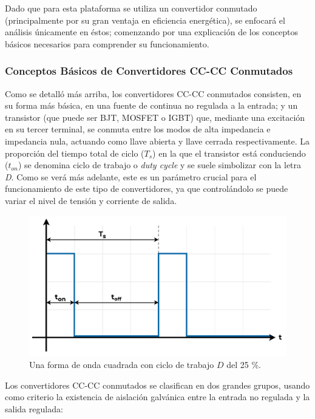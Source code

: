 Dado que para esta plataforma se utiliza un convertidor conmutado (principalmente por su gran ventaja en eficiencia energética), se enfocará el análisis únicamente en éstos; comenzando por una explicación de los conceptos básicos necesarios para comprender su funcionamiento.\\

\subsubsection{Conceptos Básicos de Convertidores CC-CC Conmutados}

Como se detalló más arriba, los convertidores CC-CC conmutados consisten, en su forma más básica, en una fuente de continua no regulada a la entrada; y un transistor (que puede ser BJT, MOSFET o IGBT) que, mediante una excitación en su tercer terminal, se conmuta entre los modos de alta impedancia e impedancia nula, actuando como llave abierta y llave cerrada respectivamente. La proporción del tiempo total de ciclo ($T_s$) en la que el transistor está conduciendo ($t_{on}$) se denomina {\Medium ciclo de trabajo} o {\Medium \textit{duty cycle}} y se suele simbolizar con la {\Medium letra \textit{D}}. Como se verá más adelante, este es un parámetro crucial para el funcionamiento de este tipo de convertidores, ya que controlándolo se puede variar el nivel de tensión y corriente de salida.

\begin{figure}[H]
    \centering
    \includegraphics[scale=0.5]{Imagenes/Duty Cycle.pdf}
    \caption{Una forma de onda cuadrada con ciclo de trabajo $D$ del 25 \%.}
    \label{dutycycle}
\end{figure}

Los convertidores CC-CC conmutados se clasifican en dos grandes grupos, usando como criterio la existencia de aislación galvánica entre la entrada no regulada y la salida regulada:

